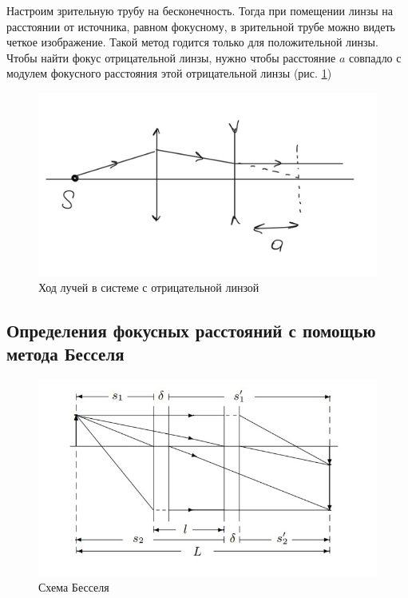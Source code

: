 \documentclass[a4paper, 12pt]{article}
\begin{document}
Настроим зрительную трубу на бесконечность. Тогда при помещении линзы на расстоянии от источника, равном фокусному, в зрительной трубе можно видеть четкое изображение. Такой метод годится
только для положительной линзы. Чтобы найти фокус отрицательной линзы, нужно чтобы расстояние $a$ совпадло с модулем фокусного расстояния этой отрицательной линзы (рис. \ref{fig:ris1})

\begin{figure}[H]
    \centering
    \includegraphics[width=1\textwidth]{ris1}
    \caption{Ход лучей в системе с отрицательной линзой}
    \label{fig:ris1}
\end{figure}

\subsection{Определения фокусных расстояний с помощью метода Бесселя}

\begin{figure}[H]
    \centering
    \includegraphics[width=1\textwidth]{bessel.jpg}
    \caption{Схема Бесселя}
    \label{fig:ris3}
\end{figure}
\end{document}
